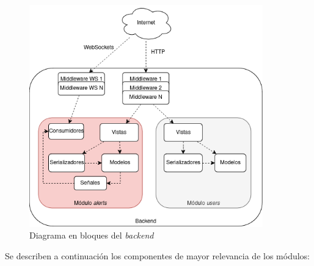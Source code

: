 \begin{figure}[H]
	\centering
	\includegraphics[width=0.9\textwidth]{./Figures/backend-componentes.png}
	\caption{Diagrama en bloques del \textit{backend}}
	\label{backend:modulos}
\end{figure}

Se describen a continuación los componentes de mayor relevancia de los módulos:

